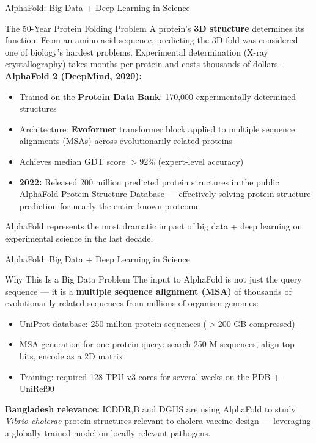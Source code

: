 \documentclass[aspectratio=169,10pt]{beamer}
\begin{document}
\begin{frame}{AlphaFold: Big Data + Deep Learning in Science}
 
      \begin{block}{The 50-Year Protein Folding Problem}
        A protein's \textbf{3D structure} determines its function.  From an amino acid sequence, predicting the 3D fold was considered one of biology's hardest problems.  Experimental determination (X-ray crystallography) takes months per protein and costs thousands of dollars.
        \vspace{4pt}
        \textbf{AlphaFold 2 (DeepMind, 2020):}
        \begin{itemize}
          \item Trained on the \textbf{Protein Data Bank}: 170{,}000 experimentally determined structures
          \item Architecture: \textbf{Evoformer} transformer block applied to multiple sequence alignments (MSAs) across evolutionarily related proteins
          \item Achieves median GDT score $>$92\% (expert-level accuracy)
          \item \textbf{2022:} Released 200 million predicted protein structures in the public AlphaFold Protein Structure Database --- effectively solving protein structure prediction for nearly the entire known proteome
        \end{itemize}
        AlphaFold represents the most dramatic impact of big data + deep learning on experimental science in the last decade.
      \end{block}

     
\end{frame}


\begin{frame}{AlphaFold: Big Data + Deep Learning in Science}
 
      \begin{exampleblock}{Why This Is a Big Data Problem}
        \small The input to AlphaFold is not just the query sequence --- it is a \textbf{multiple sequence alignment (MSA)} of thousands of evolutionarily related sequences from millions of organism genomes:
        \begin{itemize}
          \item UniProt database: 250 million protein sequences ($>$200 GB compressed)
          \item MSA generation for one protein query: search 250 M sequences, align top hits, encode as a 2D matrix
          \item Training: required 128 TPU v3 cores for several weeks on the PDB + UniRef90
        \end{itemize}
        \vspace{4pt}
        \textbf{Bangladesh relevance:} ICDDR,B and DGHS are using AlphaFold to study \textit{Vibrio cholerae} protein structures relevant to cholera vaccine design --- leveraging a globally trained model on locally relevant pathogens.
      \end{exampleblock}
  
\end{frame}
\end{document}
